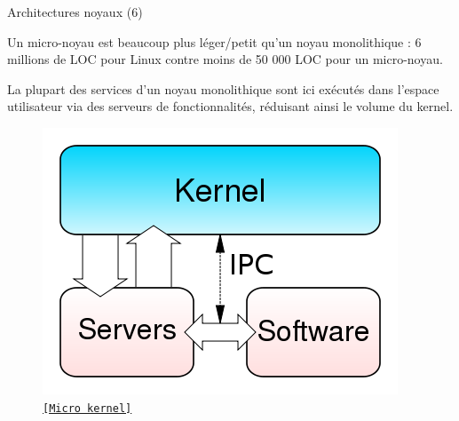 \documentclass[12pt, t]{beamer}
\newcommand{\src}[2]{\vspace{-10pt}\caption{\href{#1}{\centering \tt \tiny [#2]}}}
\begin{document}
\begin{frame}{Architectures noyaux (6)}

    \vspace{8pt}
    Un micro-noyau est beaucoup plus léger/petit qu'un noyau monolithique :
    6 millions de LOC pour Linux contre moins de 50 000 LOC pour un micro-noyau.

    {
        \vspace{8pt}
        La plupart des services d'un noyau monolithique sont ici exécutés dans
        l'espace utilisateur via des serveurs de fonctionnalités, réduisant ainsi le
        volume du kernel.

        \begin{figure}
            \centering
            \includegraphics[scale=0.32]{micro.png}
            \src{http://malhar2010.blogspot.fr/2010/11/types-of-kernel.html}{Micro kernel}
        \end{figure}
    }

\end{frame}
\end{document}
